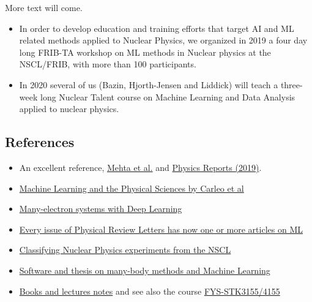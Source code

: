 \documentclass[%
oneside,                 %
final,                   %
10pt]{article}
\newenvironment{block_mdfboxadmon}[1][]{
\begin{block_mdfboxmdframed}[frametitle=#1]
}
{
\end{block_mdfboxmdframed}
}
\begin{document}
More text will come.

\begin{itemize}
\item In order to develop education and training efforts that target AI and ML related methods applied to Nuclear Physics, we  organized in 2019 a four day long  FRIB-TA workshop on ML methods in Nuclear physics at the NSCL/FRIB, with more than 100 participants.

\item In 2020 several of us (Bazin, Hjorth-Jensen and Liddick) will teach a three-week long Nuclear Talent course on Machine Learning and Data Analysis applied to nuclear physics. 
\end{itemize}

\noindent
\subsection{References}

\begin{block_mdfboxadmon}[]
\begin{itemize}
\item An excellent reference, \href{{https://arxiv.org/abs/1803.08823}}{Mehta et al.} and \href{{https://www.sciencedirect.com/science/article/pii/S0370157319300766?via%3Dihub}}{Physics Reports (2019)}.

\item \href{{https://arxiv.org/abs/1903.10563}}{Machine Learning and the Physical Sciences by Carleo et al}

\item \href{{https://arxiv.org/pdf/1909.02487.pdf}}{Many-electron systems with Deep Learning}

\item \href{{https://journals.aps.org/prl/abstract/10.1103/PhysRevLett.120.156001}}{Every issue of Physical Review Letters has now one or more articles on ML}

\item \href{{https://github.com/copperwire/thesis/blob/master/main.pdf}}{Classifying Nuclear Physics  experiments from the NSCL}

\item \href{{https://github.com/bsamseth/qflow}}{Software and thesis on many-body methods and Machine Learning}

\item \href{{https://github.com/CompPhysics/MachineLearning}}{Books and lectures notes} and see also the course \href{{https://www.uio.no/studier/emner/matnat/fys/FYS-STK4155/h18/index.html}}{FYS-STK3155/4155}
\end{itemize}

\noindent
\end{block_mdfboxadmon} %









\end{document}
